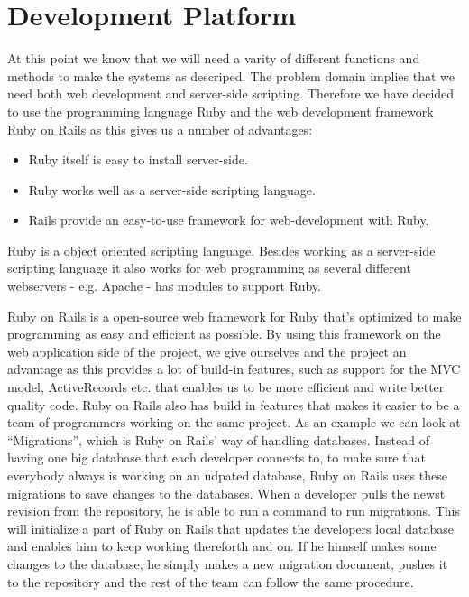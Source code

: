 \section{Development Platform}
At this point we know that we will need a varity of different functions and methods to make the systems as descriped.
The problem domain implies that we need both web development and server-side scripting. 
Therefore we have decided to use the programming language Ruby and the web development framework Ruby on Rails as this gives us a number of advantages:

\begin{itemize}
	\item Ruby itself is easy to install server-side.
	\item Ruby works well as a server-side scripting language.
	\item Rails provide an easy-to-use framework for web-development with Ruby.
\end{itemize}

Ruby is a object oriented scripting language.
Besides working as a server-side scripting language it also works for web programming as several different webservers - e.g. Apache - has modules to support Ruby. 

Ruby on Rails is a open-source web framework for Ruby that's optimized to make programming as easy and efficient as possible. 
By using this framework on the web application side of the project, we give ourselves and the project an advantage as this provides a lot of build-in features, such as support for the MVC model, ActiveRecords etc. that enables us to be more efficient and write better quality code.
Ruby on Rails also has build in features that makes it easier to be a team of programmers working on the same project.
As an example we can look at ``Migrations'', which is Ruby on Rails' way of handling databases.
Instead of having one big database that each developer connects to, to make sure that everybody always is working on an udpated database, Ruby on Rails uses these migrations to save changes to the databases.
When a developer pulls the newst revision from the repository, he is able to run a command to run migrations.
This will initialize a part of Ruby on Rails that updates the developers local database and enables him to keep working thereforth and on. 
If he himself makes some changes to the database, he simply makes a new migration document, pushes it to the repository and the rest of the team can follow the same procedure. 

